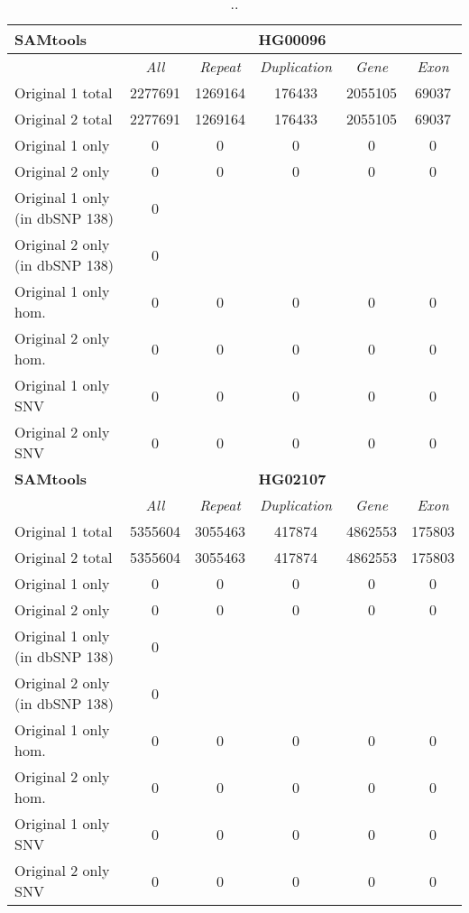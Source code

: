 \begin{table}[htb]
\begin{center}
\begin{tabular}{|l|c||c|c|c|c|}
\hline
{\bf SAMtools} & \multicolumn{5}{|c|}{\bf HG00096} \\
\hline
\cline{2-6}
{\bf} & {\it All} & {\it Repeat} & {\it Duplication} & {\it Gene} & {\it Exon} \\
\hline
Original 1 total & 2277691 & 1269164 & 176433 & 2055105 & 69037\\ 
\hline
Original 2 total & 2277691 & 1269164 & 176433 & 2055105 & 69037\\ 
\hline
Original 1 only & 0 & 0 & 0 & 0 & 0\\ 
\hline
Original 2 only & 0 & 0 & 0 & 0 & 0\\ 
\hline
Original 1 only (in dbSNP 138) & 0 &  &  &  & \\ 
\hline
Original 2 only (in dbSNP 138) & 0 &  &  &  & \\ 
\hline
Original 1 only hom. & 0 & 0 & 0 & 0 & 0\\ 
\hline
Original 2 only hom. & 0 & 0 & 0 & 0 & 0\\ 
\hline
Original 1 only SNV & 0 & 0 & 0 & 0 & 0\\ 
\hline
Original 2 only SNV & 0 & 0 & 0 & 0 & 0\\ 
\hline
\hline
{\bf SAMtools} & \multicolumn{5}{|c|}{\bf HG02107} \\
\hline
\cline{2-6}
{\bf} & {\it All} & {\it Repeat} & {\it Duplication} & {\it Gene} & {\it Exon} \\
\hline
Original 1 total & 5355604 & 3055463 & 417874 & 4862553 & 175803\\ 
\hline
Original 2 total & 5355604 & 3055463 & 417874 & 4862553 & 175803\\ 
\hline
Original 1 only & 0 & 0 & 0 & 0 & 0\\ 
\hline
Original 2 only & 0 & 0 & 0 & 0 & 0\\ 
\hline
Original 1 only (in dbSNP 138) & 0 &  &  &  & \\ 
\hline
Original 2 only (in dbSNP 138) & 0 &  &  &  & \\ 
\hline
Original 1 only hom. & 0 & 0 & 0 & 0 & 0\\ 
\hline
Original 2 only hom. & 0 & 0 & 0 & 0 & 0\\ 
\hline
Original 1 only SNV & 0 & 0 & 0 & 0 & 0\\ 
\hline
Original 2 only SNV & 0 & 0 & 0 & 0 & 0\\ 
\hline
\end{tabular}
\end{center}
\caption{ .. }
\label{tab:orig-vs-orig2-samtools}
\end{table}

